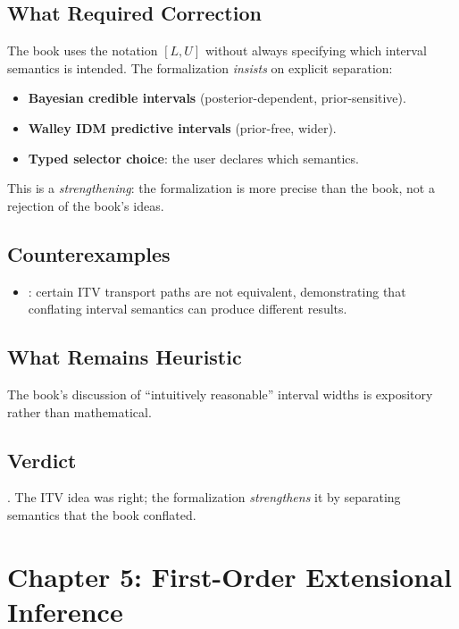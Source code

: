 \documentclass[11pt,openany]{report}
\begin{document}
\section{What Required Correction}

The book uses the notation $[L, U]$ without always specifying which
interval semantics is intended.  The formalization \emph{insists} on
explicit separation:

\begin{itemize}
\item \textbf{Bayesian credible intervals} (posterior-dependent, prior-sensitive).
\item \textbf{Walley IDM predictive intervals} (prior-free, wider).
\item \textbf{Typed selector choice}: the user declares which semantics.
\end{itemize}

This is a \emph{strengthening}: the formalization is more precise than
the book, not a rejection of the book's ideas.

\section{Counterexamples}

\begin{itemize}
\item {}: certain ITV
  transport paths are not equivalent, demonstrating that conflating
  interval semantics can produce different results.
\end{itemize}

\section{What Remains Heuristic}

The book's discussion of ``intuitively reasonable'' interval widths
is expository rather than mathematical.

\section{Verdict}

\verdictCorrected{}.  The ITV idea was right; the formalization
\emph{strengthens} it by separating semantics that the book conflated.


\chapter{Chapter 5: First-Order Extensional Inference}
\label{ch:review-ch5}
\end{document}
